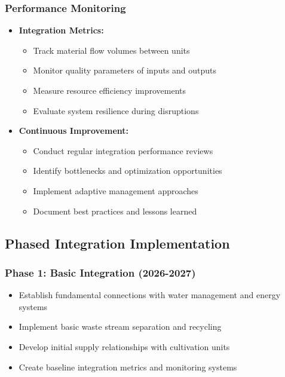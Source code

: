 \subsubsection{Performance Monitoring}
\begin{itemize}
    \item \textbf{Integration Metrics:}
    \begin{itemize}
        \item Track material flow volumes between units
        \item Monitor quality parameters of inputs and outputs
        \item Measure resource efficiency improvements
        \item Evaluate system resilience during disruptions
    \end{itemize}
    
    \item \textbf{Continuous Improvement:}
    \begin{itemize}
        \item Conduct regular integration performance reviews
        \item Identify bottlenecks and optimization opportunities
        \item Implement adaptive management approaches
        \item Document best practices and lessons learned
    \end{itemize}
\end{itemize}

\subsection{Phased Integration Implementation}

\subsubsection{Phase 1: Basic Integration (2026-2027)}
\begin{itemize}
    \item Establish fundamental connections with water management and energy systems
    \item Implement basic waste stream separation and recycling
    \item Develop initial supply relationships with cultivation units
    \item Create baseline integration metrics and monitoring systems
\end{itemize}

